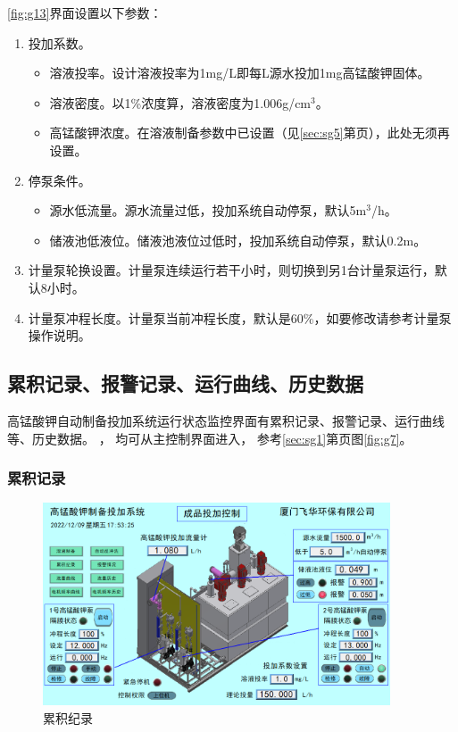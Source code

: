 \documentclass[UTF8,a4paper,12pt,titlepage]{ctexart}
\begin{document}
      \ref{fig:g13}界面设置以下参数：
      \begin{enumerate}
         \item 投加系数。
            \begin{itemize}
                \item 溶液投率。设计溶液投率为1mg/L即每L源水投加1mg高锰酸钾固体。
                \item 溶液密度。以1\%浓度算，溶液密度为1.006g/cm$^{3}$。
                \item 高锰酸钾浓度。在溶液制备参数中已设置（见\ref{sec:sg5}第\pageref{sec:sg5}页），此处无须再设置。
            \end{itemize}
         \item 停泵条件。
            \begin{itemize}
               \item 源水低流量。源水流量过低，投加系统自动停泵，默认5m$^{3}$/h。
               \item 储液池低液位。储液池液位过低时，投加系统自动停泵，默认0.2m。
            \end{itemize}
        \item 计量泵轮换设置。计量泵连续运行若干小时，则切换到另1台计量泵运行，默认8小时。
        \item 计量泵冲程长度。计量泵当前冲程长度，默认是60\%，如要修改请参考计量泵操作说明。
      \end{enumerate}

    \subsection{累积记录、报警记录、运行曲线、历史数据}
        高锰酸钾自动制备投加系统运行状态监控界面有累积记录、报警记录、运行曲线等、历史数据。
        ，
        均可从主控制界面进入，
        参考\ref{sec:sg1}第\pageref{sec:sg1}页图\ref{fig:g7}。

        \subsubsection{累积记录}
            \begin{figure}[h]
                \centering
                \includegraphics[height=6cm]{g10.PNG}
                \caption{累积纪录}\label{fig:g14}
            \end{figure}
            
\end{document}
